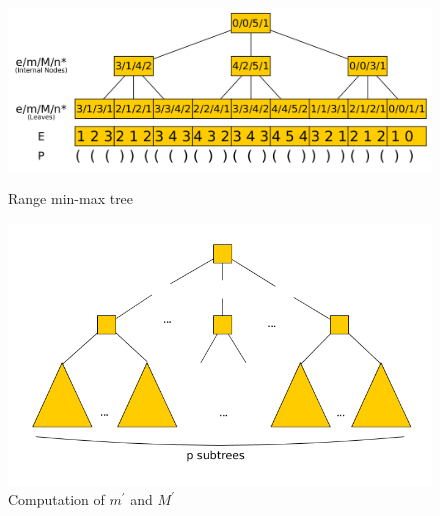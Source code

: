 \begin{figure}[ht]
\centering
\begin{minipage}{.54\textwidth}
	  \centering
	  \includegraphics[scale=0.15]{./images/Range-min-max-tree.png}
	  \caption{Range min-max tree}
	  \label{fig:RangeMinMaxTree}   
\end{minipage}%
\hfill
\begin{minipage}{.44\textwidth}
	  \centering
	  \includegraphics[scale=0.21]{./images/Min-Max-array.png}
	  \caption{Computation of $m^{\prime}$ and $M^{\prime}$}
	  \label{fig:min-max-array} 
\end{minipage}
\end{figure}


